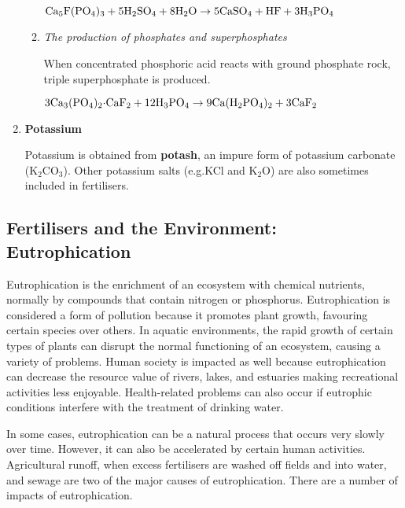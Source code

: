 \begin{enumerate}
\begin{enumerate}
\begin{center}
$\rm{Ca_{5}F(PO_{4})_{3} + 5H_{2}SO_{4} + 8H_{2}O \rightarrow 5CaSO_{4} + HF + 3H_{3}PO_{4}}$
\end{center} 

\item{\textit{The production of phosphates and superphosphates}}

When concentrated phosphoric acid reacts with ground phosphate rock, triple superphosphate is produced.

\begin{center}
$\rm{3Ca_{3}(PO_{4})_{2}{\cdot}CaF_{2} + 12H_{3}PO_{4} \rightarrow 9Ca(H_{2}PO_{4})_{2} + 3CaF_{2}}$ 
\end{center}
	\end{enumerate}

\item{\textbf{Potassium}}

Potassium is obtained from \textbf{potash}, an impure form of potassium carbonate (K$_{2}$CO$_{3}$). Other potassium salts (e.g.\@ KCl and K$_{2}$O) are also sometimes included in fertilisers.

\end{enumerate}

\subsection{Fertilisers and the Environment:\\Eutrophication}

Eutrophication is the enrichment of an ecosystem with chemical nutrients, normally by compounds that contain nitrogen or phosphorus. Eutrophication is considered a form of pollution because it promotes plant growth, favouring certain species over others. In aquatic environments, the rapid growth of  certain types of plants can disrupt the normal functioning of an ecosystem, causing a variety of problems. Human society is impacted as well because eutrophication can decrease the resource value of rivers, lakes, and estuaries making recreational activities less enjoyable. Health-related problems can also occur if eutrophic conditions interfere with the treatment of drinking water.


In some cases, eutrophication can be a natural process that occurs very slowly over time. However, it can also be accelerated by certain human activities. Agricultural runoff, when excess fertilisers are washed off fields and into water, and sewage are two of the major causes of eutrophication. There are a number of impacts of eutrophication.

